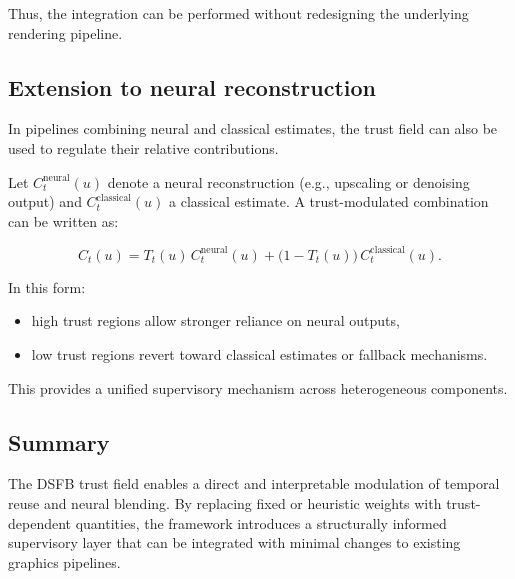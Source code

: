 \documentclass[11pt,letterpaper]{article}
\theoremstyle{gcresult}
\theoremstyle{definition}
\begin{document}
Thus, the integration can be performed without redesigning the underlying rendering pipeline.


\subsection{Extension to neural reconstruction}

In pipelines combining neural and classical estimates, the trust field can also be used to regulate their relative contributions.

Let $C_t^{\mathrm{neural}}(u)$ denote a neural reconstruction (e.g., upscaling or denoising output) and $C_t^{\mathrm{classical}}(u)$ a classical estimate. A trust-modulated combination can be written as:

\begin{equation}
C_t(u) = T_t(u)\, C_t^{\mathrm{neural}}(u)
+ \bigl(1 - T_t(u)\bigr)\, C_t^{\mathrm{classical}}(u).
\end{equation}

In this form:

\begin{itemize}[leftmargin=1.5em]
    \item high trust regions allow stronger reliance on neural outputs,
    \item low trust regions revert toward classical estimates or fallback mechanisms.
\end{itemize}

This provides a unified supervisory mechanism across heterogeneous components.


\subsection{Summary}

The DSFB trust field enables a direct and interpretable modulation of temporal reuse and neural blending. By replacing fixed or heuristic weights with trust-dependent quantities, the framework introduces a structurally informed supervisory layer that can be integrated with minimal changes to existing graphics pipelines.
\end{document}
